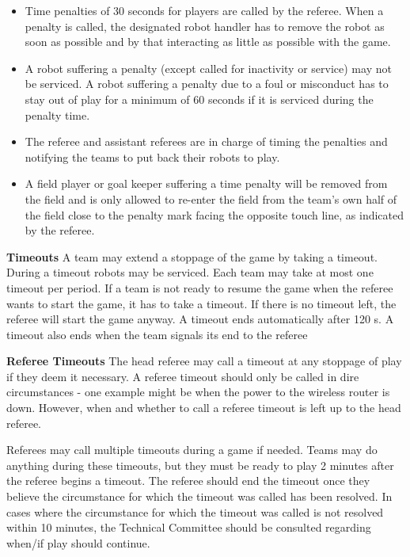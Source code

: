 \begin{itemize}
\item Time penalties of 30 seconds for players are called by the referee. When a penalty is called, the designated robot handler has to remove the robot as soon as possible and by that interacting as little as possible with the game. 
\item A robot suffering a penalty (except called for inactivity or service) may not be serviced. A robot suffering a penalty due to a foul or misconduct has to stay out of play for a minimum of 60 seconds if it is serviced during the penalty time.
\item The referee and assistant referees are in charge of timing the penalties and notifying the teams to put back their robots to play.
\item A field player or goal keeper suffering a time penalty will be removed from the field and is only allowed to re-enter the field from the team's own half of the field close to the penalty mark facing the opposite touch line, as indicated by the referee.
\end{itemize}

\bigskip

{\bfseries Timeouts}
A team may extend a stoppage of the game by taking a timeout. During a timeout
robots may be serviced. Each team may take at most one timeout per period. If a team is not ready to resume the game when the referee wants to start the game, it has to take a timeout. If there is no timeout left, the referee will start
the game anyway. A timeout ends automatically after 120 s. A timeout also ends when the team signals its end to the referee

\bigskip

{\bfseries Referee Timeouts}
The head referee may call a timeout at any stoppage of play if they deem it necessary. A referee timeout should only be called in dire circumstances - one example might be when the power to the wireless router is down. However, when and whether to call a referee timeout is left up to the head referee.

Referees may call multiple timeouts during a game if needed. Teams may do anything during these timeouts, but they must be ready to play 2 minutes after the referee begins a timeout. The referee should end the timeout once they believe the circumstance for which the timeout was called has been resolved. In cases where the circumstance for which the timeout was called is not resolved within 10 minutes, the Technical Committee should be consulted regarding when/if play should continue.

